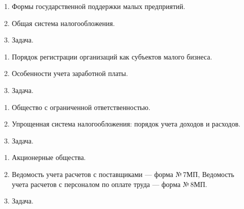 \newpage


\shapkFull
\setcounter{zad}{0}

\begin{enumerate}
	\item Формы государственной поддержки малых предприятий.

	\item Общая система налогообложения.

	\item Задача.
\end{enumerate}

\newpage


\shapkFull
\setcounter{zad}{0}

\begin{enumerate}
	\item Порядок регистрации организаций как субъектов малого бизнеса.

	\item Особенности учета заработной платы.

	\item Задача.
\end{enumerate}

\newpage


\shapkFull
\setcounter{zad}{0}

\begin{enumerate}
	\item Общество с ограниченной ответственностью.

	\item Упрощенная система налогообложения: порядок учета доходов и расходов.

	\item Задача.
\end{enumerate}

\newpage


\shapkFull
\setcounter{zad}{0}

\begin{enumerate}
	\item Акционерные общества.

	\item Ведомость учета расчетов с поставщиками --- форма №\,7МП, Ведомость учета расчетов с персоналом по оплате труда --- форма №\,8МП.

	\item Задача.
\end{enumerate}

